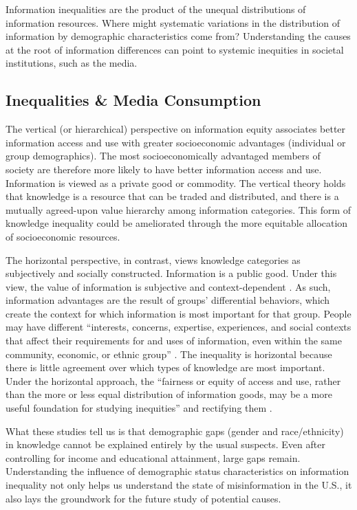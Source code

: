 \documentclass[11pt]{article}
\begin{document}
Information inequalities are the product of the unequal distributions of information resources.
Where might systematic variations in the distribution of
information by demographic characteristics come from? Understanding the causes
at the root of information differences can point to systemic inequities in societal institutions, such as the media.

\subsection{Inequalities \& Media Consumption}

The vertical (or hierarchical) perspective on information equity associates
better information access and use with greater socioeconomic advantages
(individual or group demographics). The most socioeconomically advantaged
members of society are therefore more likely to have better information access
and use. Information is viewed as a private good or commodity. The vertical
theory holds that knowledge is a resource that can be traded and distributed,
and there is a mutually agreed-upon value hierarchy among information
categories. This form of knowledge inequality could be ameliorated through the
more equitable allocation of socioeconomic resources.

The horizontal perspective, in contrast, views knowledge categories as
subjectively and socially constructed. Information is a public good. Under this
view, the value of information is subjective and context-dependent
\citep{Lievrouw}. As such, information advantages are the result of groups'
differential behaviors, which create the context for which information is most
important for that group. People may have different ``interests, concerns,
expertise, experiences, and social contexts that affect their requirements for
and uses of information, even within the same community, economic, or ethnic
group'' \citep[501]{Lievrouw}. The inequality is horizontal because there is
little agreement over which types of knowledge are most important. Under the
horizontal approach, the ``fairness or equity of access and use, rather than the
more or less equal distribution of information goods, may be a more useful
foundation for studying inequities'' and rectifying them \citep[501]{Lievrouw}.


What these studies tell us is that demographic gaps (gender and race/ethnicity) in knowledge cannot be explained entirely by the usual suspects. Even after controlling for income and educational attainment, large gaps remain. Understanding the influence of demographic status characteristics on information inequality not only helps us understand the state of misinformation in the U.S., it also lays the groundwork for the future study of potential causes.
\end{document}
